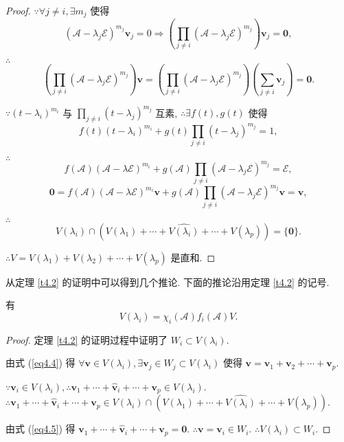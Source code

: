 \documentclass[color=black,device=normal,lang=cn,mode=geye]{elegantnote}
\begin{document}
\begin{proof}
    $\because\forall j\neq i,\exists m_j$ 使得
    \[(\mathcal{A}-\lambda_j\mathcal{E})^{m_j}\boldsymbol{v}_j=0\Rightarrow\left(\prod\limits_{j\neq i}(\mathcal{A}-\lambda_j\mathcal{E})^{m_j}\right)\boldsymbol{v}_j=\boldsymbol{0},\]
    
    $\therefore$
    \[\left(\prod\limits_{j\neq i}(\mathcal{A}-\lambda_j\mathcal{E})^{m_j}\right)\boldsymbol{v}=\left(\prod\limits_{j\neq i}(\mathcal{A}-\lambda_j\mathcal{E})^{m_j}\right)\left(\sum\limits_{j\neq i}\boldsymbol{v}_j\right)=\boldsymbol{0}.\]

    $\because(t-\lambda_i)^{m_i}$ 与 $\prod\limits_{j\neq i}(t-\lambda_j)^{m_j}$ 互素, $\therefore\exists f(t),g(t)$ 使得
    \[f(t)(t-\lambda_i)^{m_i}+g(t)\prod\limits_{j\neq i}(t-\lambda_j)^{m_j}=1,\]

    $\therefore$
    \[f(\mathcal{A})(\mathcal{A}-\lambda\mathcal{E})^{m_i}+g(\mathcal{A})\prod\limits_{j\neq i}(\mathcal{A}-\lambda_j\mathcal{E})^{m_j}=\mathcal{E},\]
    \[\boldsymbol{0}=f(\mathcal{A})(\mathcal{A}-\lambda\mathcal{E})^{m_i}\boldsymbol{v}+g(\mathcal{A})\prod\limits_{j\neq i}(\mathcal{A}-\lambda_j\mathcal{E})^{m_j}\boldsymbol{v}=\boldsymbol{v},\]

    $\therefore$
    \begin{equation}\label{eq4.5}
        V(\lambda_i)\cap(V(\lambda_1)+\cdots+\widehat{V(\lambda_i)}+\cdots+V(\lambda_p))=\{\boldsymbol{0}\}.
    \end{equation}

    $\therefore V=V(\lambda_1)+V(\lambda_2)+\cdots+V(\lambda_p)$ 是直和.
\end{proof}
从定理 \ref{t4.2} 的证明中可以得到几个推论. 下面的推论沿用定理 \ref{t4.2} 的记号.
\begin{corollary}\label{c4.2}
    有
    \[V(\lambda_i)=\chi_i(\mathcal{A})f_i(\mathcal{A})V.\]
\end{corollary}
\begin{proof}
    定理 \ref{t4.2} 的证明过程中证明了 $W_i\subset V(\lambda_i)$.

    由式 (\ref{eq4.4}) 得 $\forall\boldsymbol{v}\in V(\lambda_i),\exists\boldsymbol{v}_j\in W_j\subset V(\lambda_i)$ 使得 $\boldsymbol{v}=\boldsymbol{v}_1+\boldsymbol{v}_2+\cdots+\boldsymbol{v}_p$.

    $\because\boldsymbol{v}_i\in V(\lambda_i),\therefore\boldsymbol{v}_1+\cdots+\hat{\boldsymbol{v}}_i+\cdots+\boldsymbol{v}_p\in V(\lambda_i)$. $\therefore\boldsymbol{v}_1+\cdots+\hat{\boldsymbol{v}}_i+\cdots+\boldsymbol{v}_p\in V(\lambda_i)\cap(V(\lambda_1)+\cdots+\widehat{V(\lambda_i)}+\cdots+V(\lambda_p))$.

    由式 (\ref{eq4.5}) 得 $\boldsymbol{v}_1+\cdots+\hat{\boldsymbol{v}}_i+\cdots+\boldsymbol{v}_p=\boldsymbol{0}$. $\therefore\boldsymbol{v}=\boldsymbol{v}_i\in W_i$. $\therefore V(\lambda_i)\subset W_i$.
\end{proof}
\end{document}
